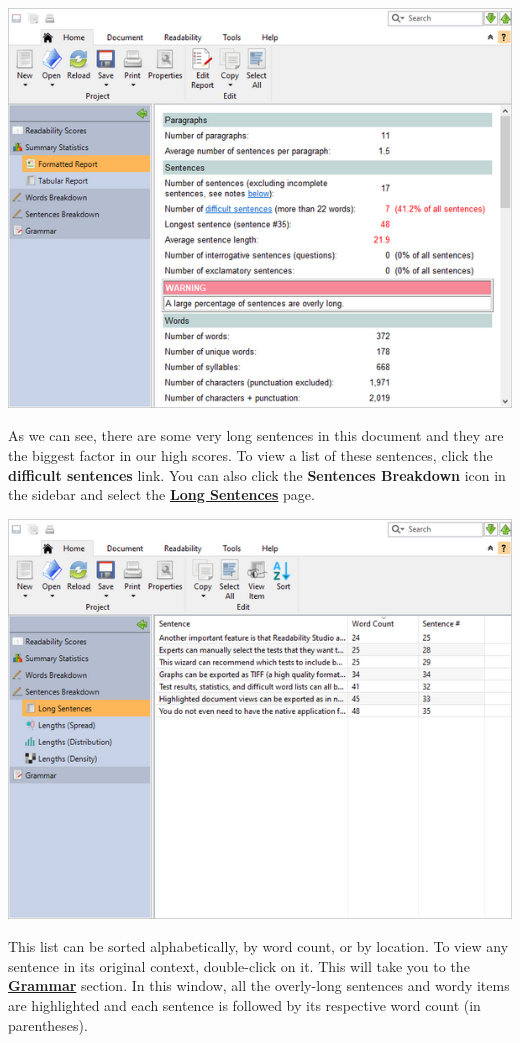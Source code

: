 \documentclass[
]{book}
\theoremstyle{definition}
\theoremstyle{definition}
\theoremstyle{definition}
\theoremstyle{definition}
\theoremstyle{remark}
\begin{document}
\includegraphics{Images/featuresstats.png}

As we can see, there are some very long sentences in this document and they are the biggest factor in our high scores. To view a list of these sentences, click the \textbf{difficult sentences} link. You can also click the \textbf{Sentences Breakdown} icon in the sidebar and select the \protect\hyperlink{reviewing-sentences-breakdown}{\textbf{Long Sentences}} page.

\includegraphics{Images/featuressentencelist.png}

This list can be sorted alphabetically, by word count, or by location. To view any sentence in its original context, double-click on it. This will take you to the \protect\hyperlink{reviewing-standard-grammar}{\textbf{Grammar}} section. In this window, all the overly-long sentences and wordy items are highlighted and each sentence is followed by its respective word count (in parentheses).
\end{document}
